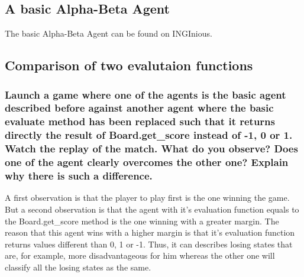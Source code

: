 \documentclass[10pt,a4paper]{article}
\begin{document}
\subsection{A basic Alpha-Beta Agent}

The basic Alpha-Beta Agent can be found on INGInious.

\subsection{Comparison of two evalutaion functions}

\subsubsection{Launch a game where one of the agents is the basic agent described before against another agent where the basic evaluate method has been replaced such that it returns directly the result of Board.get\_score instead of -1, 0 or 1. Watch the replay of the match. What do you observe? Does one of the agent clearly overcomes the other one? Explain why there is such a difference.}

A first observation is that the player to play first is the one winning the game. But a second observation is that the agent with it's evaluation function equals to the Board.get\_score method is the one winning with a greater margin. The reason that this agent wins with a higher margin is that it's evaluation function returns values different than 0, 1 or -1. Thus, it can describes  losing states that are, for example, more disadvantageous for him whereas the other one will classify all the losing states as the same.
\end{document}
